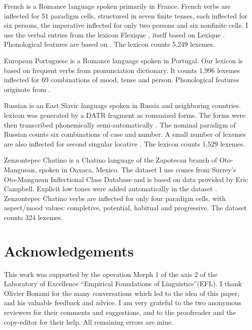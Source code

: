 \documentclass[output=paper]{langscibook}
\begin{document}
    French is a Romance language spoken primarily in France. French verbs are inflected for 51 paradigm cells, structured in seven finite tenses, each inflected for six persons, the imperative inflected for only two persons and six nonfinite cells. I use the verbal entries from the lexicon Flexique \citep{BonamiCaronPlancq2014}, itself based on Lexique \citep{NewPallierFerrandMatos2001}. Phonological features are based on \citet{Dell1973}. The lexicon counts 5,249 lexemes.
    
    European Portuguese is a Romance language spoken in Portugal. Our lexicon is based on frequent verbs from  pronunciation dictionary. It counts 1,996 lexemes inflected for 69 combinations of mood, tense and person. Phonological features originate from \citet{BonamiLuis2014}.
    
    Russian is an East Slavic language spoken in Russia and neighboring countries.   lexicon was generated by a DATR fragment \cite{BrownHippisley2012} as romanized forms. The forms were then transcribed phonemically semi-automatically \citep{BeniaminePhd}. The nominal paradigm of Russian counts six combinations of case and number. A small number of lexemes are also inflected for second singular locative \citep[see][]{Brown2007}. The lexicon counts 1,529 lexemes. 
    
    Zenzontepec Chatino is a Chatino language of the Zapotecan branch of Oto-Manguean, spoken in Oaxaca, Mexico. The dataset I use comes from Surrey's Oto-Manguean Inflectional Class Database \citep{FeistPalancar2015} and is based on data provided by Eric Campbell. Explicit low tones were added automatically in the dataset \citep{BeniaminePhd}. Zenzontepec Chatino verbs are inflected for only four paradigm cells, with aspect/mood values: completive, potential, habitual and progressive. The dataset counts 324 lexemes.
    
    
    
    \section*{Acknowledgements}
    This work was supported by the operation Morph 1 of the axis 2 of
    the Laboratory of Excellence ``Empirical Foundations of
    Linguistics''(EFL). I thank Olivier Bonami for the many
    conversations which led to the idea of this paper, and his
    valuable feedback and advice. I am very grateful to the two
    anonymous reviewers for their comments and suggestions, and to the
    proofreader and the copy-editor for their help. All remaining errors are mine.
    
    
    \printbibliography[heading=subbibliography,notkeyword=this]
    
\end{document}
